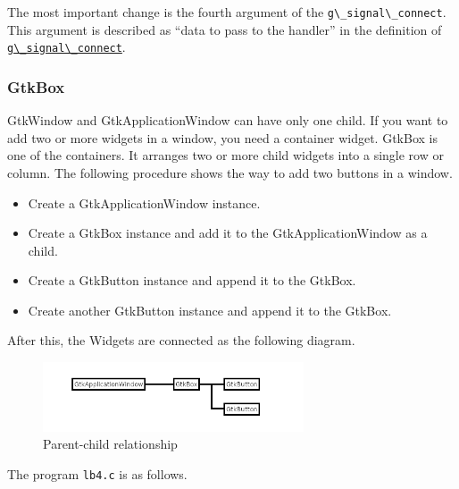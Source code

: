 The most important change is the fourth argument of the
\passthrough{\lstinline!g\_signal\_connect!}. This argument is described
as ``data to pass to the handler'' in the definition of
\href{https://docs.gtk.org/gobject/func.signal_connect.html}{\passthrough{\lstinline!g\_signal\_connect!}}.

\subsubsection{GtkBox}\label{gtkbox}

GtkWindow and GtkApplicationWindow can have only one child. If you want
to add two or more widgets in a window, you need a container widget.
GtkBox is one of the containers. It arranges two or more child widgets
into a single row or column. The following procedure shows the way to
add two buttons in a window.

\begin{itemize}
\tightlist
\item
  Create a GtkApplicationWindow instance.
\item
  Create a GtkBox instance and add it to the GtkApplicationWindow as a
  child.
\item
  Create a GtkButton instance and append it to the GtkBox.
\item
  Create another GtkButton instance and append it to the GtkBox.
\end{itemize}

After this, the Widgets are connected as the following diagram.

\begin{figure}
\centering
\includegraphics[width=7.725cm,height=2.055cm]{../image/box.png}
\caption{Parent-child relationship}
\end{figure}

The program \passthrough{\lstinline!lb4.c!} is as follows.

